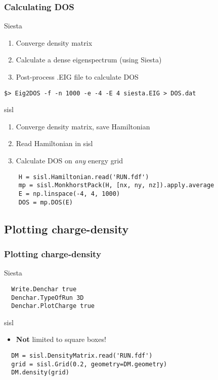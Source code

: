 \begin{frame}[fragile]
  \frametitle{Calculating DOS}

  \begin{block}{Siesta}
    \begin{enumerate}
      \item Converge density matrix
      \item Calculate a dense eigenspectrum (using Siesta)
      \item Post-process .EIG file to calculate DOS
    \end{enumerate}
\begin{verbatim}
$> Eig2DOS -f -n 1000 -e -4 -E 4 siesta.EIG > DOS.dat
\end{verbatim}
    
  \end{block}

  \begin{block}{sisl}
    \begin{enumerate}
      \item Converge density matrix, save Hamiltonian
      \item Read Hamiltonian in sisl
      \item Calculate DOS on \emph{any} energy grid
    \end{enumerate}

\begin{verbatim}
    H = sisl.Hamiltonian.read('RUN.fdf')
    mp = sisl.MonkhorstPack(H, [nx, ny, nz]).apply.average
    E = np.linspace(-4, 4, 1000)
    DOS = mp.DOS(E)
\end{verbatim}
  \end{block}
  
\end{frame}


\subsection{Plotting charge-density}

\begin{frame}[fragile]
  \frametitle{Plotting charge-density}

  \begin{block}{Siesta}
\begin{verbatim}
  Write.Denchar true
  Denchar.TypeOfRun 3D
  Denchar.PlotCharge true
\end{verbatim}
    
  \end{block}

  \begin{block}{sisl}

    \begin{itemize}
      \item \textbf{Not} limited to square boxes!
    \end{itemize}

\begin{verbatim}
  DM = sisl.DensityMatrix.read('RUN.fdf')
  grid = sisl.Grid(0.2, geometry=DM.geometry)
  DM.density(grid)
\end{verbatim}
  \end{block}
  
\end{frame}


